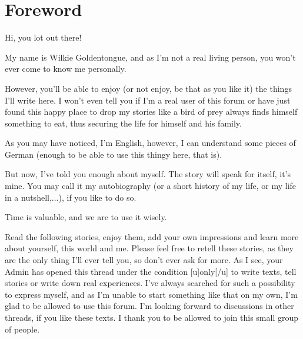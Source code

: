 \frontmatter
\chapter{Foreword}
\label{cha:foreword}
Hi, you lot out there!

My name is Wilkie Goldentongue, and as I'm not a real living person, you won't ever come to know me personally.

However, you'll be able to enjoy (or not enjoy, be that as you like it) the things I'll write here.
I won't even tell you if I'm a real user of this forum or have just found this happy place to drop my stories like a bird of prey always finds himself something to eat, thus securing the life for himself and his family.

As you may have noticed, I'm English, however, I can understand some pieces of German (enough to be able to use this thingy here, that is). 

But now, I've told you enough about myself. The story will speak for itself, it's mine. You may call it my autobiography (or a short history of my life, or my life in a nutshell,...), if you like to do so. 

Time is valuable, and we are to use it wisely. 

Read the following stories, enjoy them, add your own impressions and learn more about yourself, this world and me. Please feel free to retell these stories, as they are the only thing I'll ever tell you, so don't ever ask for more. As I see, your Admin has opened this thread under the condition [u]only[/u] to write texts, tell stories or write down real experiences. I've always searched for such a possibility to express myself, and as I'm unable to start something like that on my own, I'm glad to be allowed to use this forum. I'm looking forward to discussions in other threads, if you like these texts. I thank you to be allowed to join this small group of people. 
